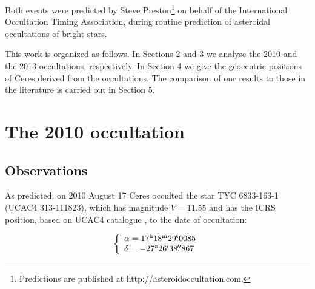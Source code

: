 \documentclass[useAMS,usenatbib]{mn2e}
\begin{document}
Both events were predicted by Steve Preston\footnote{Predictions are published at http://asteroidoccultation.com.} on behalf of the International Occultation Timing Association, during routine prediction of asteroidal occultations of bright stars.

This work is organized as follows. In Sections 2 and 3 we analyse the 2010 and the 2013 occultations, respectively. In Section 4 we give the geocentric positions of Ceres derived from the occultations. The comparison of our results to those in the literature is carried out in Section 5.



\section{The 2010 occultation}

\subsection{Observations}


As predicted, on 2010 August 17 Ceres occulted the star TYC 6833-163-1 (UCAC4 313-111823), which has magnitude $V = 11.55$ and has the ICRS position, based on UCAC4 catalogue \citep{Zacharias2013}, to the date of occultation:

\begin{equation}
\left\{ 
  \begin{array}{l l}
    \alpha = 17^{\rmn{h}}18^{\rmn{m}}29\fs0085\\
    \delta = -27\degr 26\arcmin 38\farcs 867
  \end{array}
\right.
\label{Eq: 2010-coord}
\end{equation}

%
%
\end{document}
